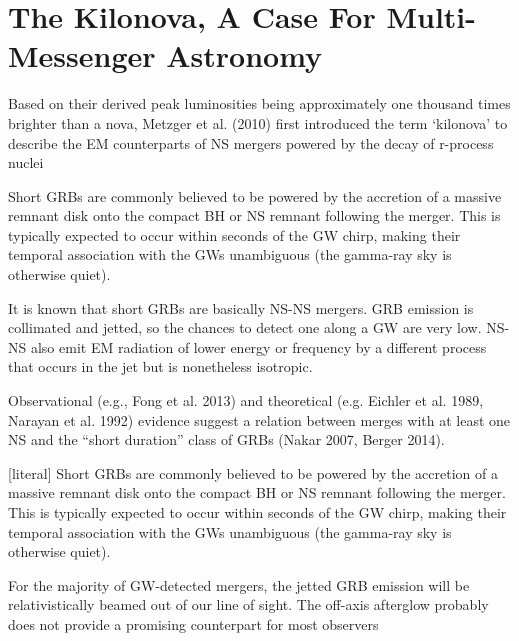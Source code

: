 \chapter{The Kilonova, A Case For Multi-Messenger Astronomy}


Based on their derived peak luminosities being approximately one thousand times brighter than a nova, Metzger et al. (2010) first introduced the term `kilonova' to describe the EM counterparts of NS mergers powered by the decay of r-process nuclei


Short GRBs are commonly believed to be powered by the accretion of a massive remnant disk onto the compact BH or NS remnant following the merger. This is typically expected to occur within seconds of the GW chirp, making their temporal association with the GWs unambiguous (the gamma-ray sky is otherwise quiet).

It is known that short GRBs are basically NS-NS mergers.
GRB emission is collimated and jetted, so the chances to detect one along a GW are very low.
NS-NS also emit EM radiation of lower energy or frequency by a different process that occurs in the jet but is nonetheless isotropic. 

Observational (e.g., Fong et al. 2013) and theoretical (e.g. Eichler et al. 1989, Narayan et al. 1992) evidence suggest a relation between merges with at least one NS and the ``short duration'' class of GRBs (Nakar 2007, Berger 2014). 


[literal] Short GRBs are commonly believed to be powered by the accretion of a massive remnant disk onto the compact BH or NS remnant following the merger. This is typically expected to occur within seconds of the GW chirp, making their temporal association with the GWs unambiguous (the gamma-ray sky is otherwise quiet).

For the majority of GW-detected mergers, the jetted GRB emission will be relativistically beamed out of our line of sight.
The off-axis afterglow probably does not provide a promising counterpart for most observers

